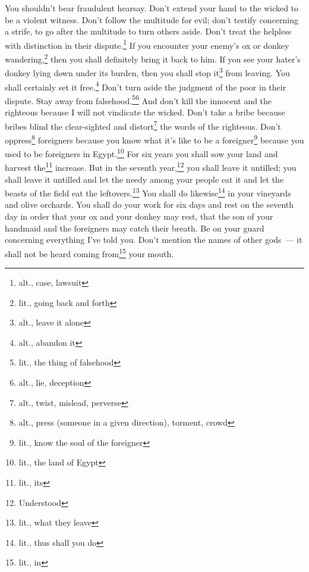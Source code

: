 

\begin{enumerate*}[mode=unboxed]
     You shouldn't bear fraudulent hearsay. Don't extend your hand to the wicked to be a violent witness.%
     Don't follow the multitude for evil; don't testify concerning a strife, to go after the multitude to turn others aside.%
     Don't treat the helpless with distinction in their dispute.\footnote{alt., case, lawsuit}%
     If you encounter your enemy's ox or donkey wandering,\footnote{lit., going back and forth} then you shall definitely bring it back to him.%
     If you see your hater's donkey lying down under its burden, then you shall stop it\footnote{alt., leave it alone} from leaving. You shall certainly set it free.\footnote{alt., abandon it}%
     Don't turn aside the judgment of the poor in their dispute.%
     Stay away from falsehood.\footnote{lit., the thing of falsehood}\footnote{alt., lie, deception} And don't kill the innocent and the righteous because I will not vindicate the wicked.%
     Don't take a bribe because bribes blind the clear-sighted and distort\footnote{alt., twist, mislead, perverse} the words of the righteous.%
     Don't oppress\footnote{alt., press (someone in a given direction), torment, crowd} foreigners because you know what it's like to be a foreigner\footnote{lit., know the soul of the foreigner} because you used to be foreigners in Egypt.\footnote{lit., the land of Egypt}%
     For six years you shall sow your land and harvest the\footnote{lit., its} increase.%
     But in the seventh year,\footnote{Understood} you shall leave it untilled; you shall leave it untilled and let the needy among your people eat it and let the beasts of the field eat the leftovers.\footnote{lit., what they leave} You shall do likewise\footnote{lit., thus shall you do} in your vineyards and olive orchards.%
     You shall do your work for six days and rest on the seventh day in order that your ox and your donkey may rest, that the son of your handmaid and the foreigners may catch their breath.%
     Be on your guard concerning everything I've told you. Don't mention the names of other gods~--- it shall not be heard coming from\footnote{lit., in} your mouth.%

\end{enumerate*}

